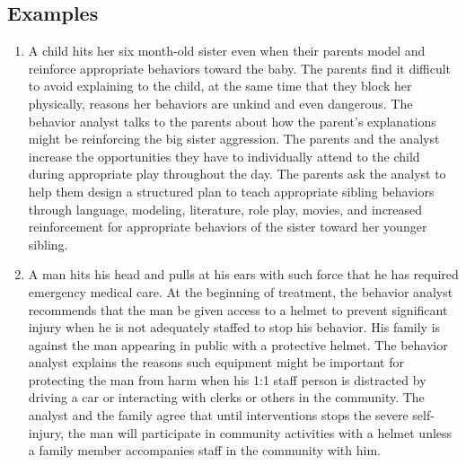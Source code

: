 \subsection{Examples}
\begin{enumerate}
\item A child hits her six month-old sister even when their parents model and reinforce appropriate behaviors toward the baby. The parents find it difficult to avoid explaining to the child, at the same time that they block her physically, reasons her behaviors are unkind and even dangerous. The behavior analyst talks to the parents about how the parent's explanations might be reinforcing the big sister aggression. The parents and the analyst increase the opportunities they have to individually attend to the child during appropriate play throughout the day. The parents ask the analyst to help them design a structured plan to teach appropriate sibling behaviors through language, modeling, literature, role play, movies, and increased reinforcement for appropriate behaviors of the sister toward her younger sibling.
\item A man hits his head and pulls at his ears with such force that he has required emergency medical care. At the beginning of treatment, the behavior analyst recommends that the man be given access to a helmet to prevent significant injury when he is not adequately staffed to stop his behavior. His family is against the man appearing in public with a protective helmet. The behavior analyst explains the reasons such equipment might be important for protecting the man from harm when his 1:1 staff person is distracted by driving a car or interacting with clerks or others in the community. The analyst and the family agree that until interventions stops the severe self-injury, the man will participate in community activities with a helmet unless a family member accompanies staff in the community with him. 
%
\end{enumerate}
